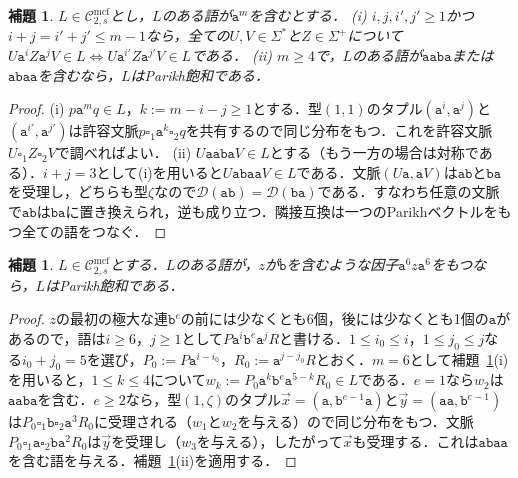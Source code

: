 \documentclass[11pt,a4paper]{ltjsarticle}
\numberwithin{equation}{section}
\theoremstyle{plain}
\newtheorem{lemma}[theorem]{補題}
\theoremstyle{definition}
\theoremstyle{remark}
\newcommand{\Cmcf}[2]{\mathcal{C}^{\mathrm{mcf}}_{#1,#2}}
\newcommand{\D}{\mathcal{D}}
\newcommand{\tuple}[1]{\vec{#1}}
\newcommand{\blank}{\square}
\begin{document}
\begin{lemma}\label{lem:app-u1-transfer}
$L\in\Cmcf{2}{s}$とし，$L$のある語が$\mathtt a^m$を含むとする．
\textup{(i)} $i,j,i',j'\ge1$かつ$i+j=i'+j'\le m-1$なら，全ての$U,V\in\Sigma^*$と$Z\in\Sigma^+$について$U\mathtt a^iZ\mathtt a^jV\in L\iff U\mathtt a^{i'}Z\mathtt a^{j'}V\in L$である．
\textup{(ii)} $m\ge4$で，$L$のある語が$\mathtt a\mathtt a\mathtt b\mathtt a$または$\mathtt a\mathtt b\mathtt a\mathtt a$を含むなら，$L$はParikh飽和である．
\end{lemma}

\begin{proof}
(i) $p\mathtt a^mq\in L$，$k:=m-i-j\ge1$とする．型$(1,1)$のタプル$(\mathtt a^i,\mathtt a^j)$と$(\mathtt a^{i'},\mathtt a^{j'})$は許容文脈$p\blank_1\mathtt a^k\blank_2q$を共有するので同じ分布をもつ．これを許容文脈$U\blank_1Z\blank_2V$で調べればよい．
(ii) $U\mathtt a\mathtt a\mathtt b\mathtt a V\in L$とする（もう一方の場合は対称である）．$i+j=3$として(i)を用いると$U\mathtt a\mathtt b\mathtt a\mathtt aV\in L$である．文脈$(U\mathtt a,\mathtt aV)$は$\mathtt{ab}$と$\mathtt{ba}$を受理し，どちらも型$\zeta$なので$\D(\mathtt{ab})=\D(\mathtt{ba})$である．すなわち任意の文脈で$\mathtt{ab}$は$\mathtt{ba}$に置き換えられ，逆も成り立つ．隣接互換は一つのParikhベクトルをもつ全ての語をつなぐ．
\end{proof}

\begin{lemma}\label{lem:app-u1-deep}
$L\in\Cmcf{2}{s}$とする．$L$のある語が，$z$が$\mathtt b$を含むような因子$\mathtt a^6z\mathtt a^6$をもつなら，$L$はParikh飽和である．
\end{lemma}

\begin{proof}
$z$の最初の極大な連$\mathtt b^e$の前には少なくとも6個，後には少なくとも1個の$\mathtt a$があるので，語は$i\ge6$，$j\ge1$として$P\mathtt a^i\mathtt b^e\mathtt a^jR$と書ける．$1\le i_0\le i$，$1\le j_0\le j$なる$i_0+j_0=5$を選び，$P_0:=P\mathtt a^{i-i_0}$，$R_0:=\mathtt a^{j-j_0}R$とおく．$m=6$として補題~\ref{lem:app-u1-transfer}(i)を用いると，$1\le k\le4$について$w_k:=P_0\mathtt a^k\mathtt b^e\mathtt a^{5-k}R_0\in L$である．$e=1$なら$w_2$は$\mathtt{aaba}$を含む．$e\ge2$なら，型$(1,\zeta)$のタプル$\tuple x=(\mathtt a,\mathtt b^{e-1}\mathtt a)$と$\tuple y=(\mathtt a\mathtt a,\mathtt b^{e-1})$は$P_0\blank_1\mathtt b\blank_2\mathtt a^3R_0$に受理される（$w_1$と$w_2$を与える）ので同じ分布をもつ．文脈$P_0\blank_1\mathtt a\blank_2\mathtt b\mathtt a^2R_0$は$\tuple y$を受理し（$w_3$を与える），したがって$\tuple x$も受理する．これは$\mathtt{abaa}$を含む語を与える．補題~\ref{lem:app-u1-transfer}(ii)を適用する．
\end{proof}
\end{document}
